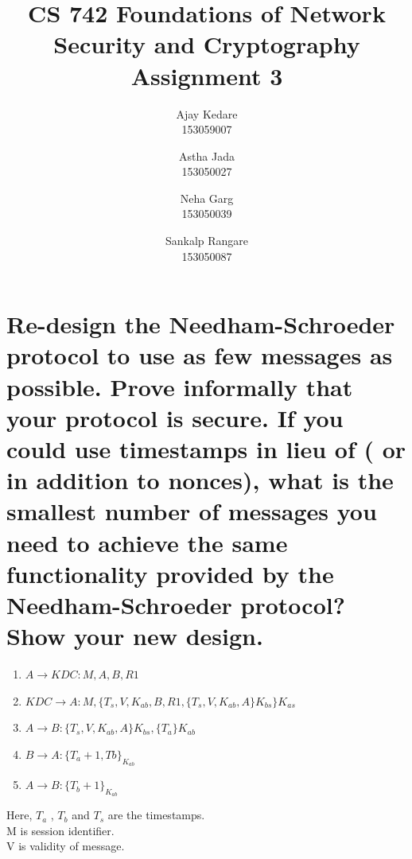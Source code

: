 \documentclass{article}
\title{CS 742 Foundations of Network Security and Cryptography \\ Assignment 3}
\author{
  Ajay Kedare \\
  153059007
  \and
  Astha Jada \\
  153050027
  \and
  Neha Garg \\
  153050039
  \and
  Sankalp Rangare \\
  153050087
}
\begin{document}
\maketitle
\clearpage

\section{Re-design the Needham-Schroeder protocol to use as few messages as possible. Prove
informally that your protocol is secure.
If you could use timestamps in lieu of ( or in addition to nonces), what is the smallest
number of messages you need to achieve the same functionality provided by the
Needham-Schroeder protocol? Show your new design.}

 \begin{enumerate}
  \item $A \rightarrow KDC: M,A,B,R1$
  \item	$KDC \rightarrow A: M,\{T_s,V,K_{ab},B,R1,\{T_s, V, K_{ab},A\}K_{bs}\}K_{as}$
  \item $A \rightarrow B: \{T_s, V, K_{ab},A\}K_{bs},\{T_a\}K_{ab}$
  \item $B \rightarrow A: \{T_a+1,Tb\}_{K_{ab}}$
  \item $A \rightarrow B: \{T_b+1\}_{K_{ab}}$
 \end{enumerate} 
 
 \noindent Here, $T_a$ , $T_b$ and $T_s$ are the timestamps. \\ 
 M is session identifier. \\
 V is validity of message. \\
 
\end{document}
